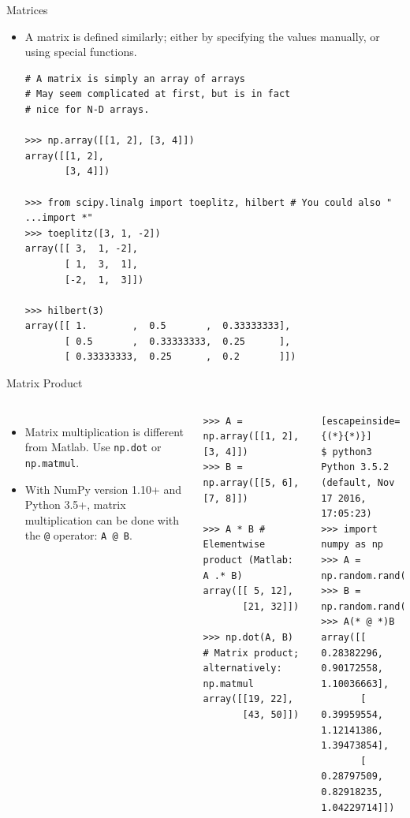 \documentclass[10pt, aspectratio=169]{beamer} %
\begin{document}
\begin{frame}[fragile,allowframebreaks=0.8]
 {Matrices}
\begin{itemize}
\item A matrix is defined similarly; either by specifying the values
manually, or using special functions.
\begin{lstlisting}
# A matrix is simply an array of arrays
# May seem complicated at first, but is in fact
# nice for N-D arrays.

>>> np.array([[1, 2], [3, 4]])
array([[1, 2],
       [3, 4]])

>>> from scipy.linalg import toeplitz, hilbert # You could also " ...import *"
>>> toeplitz([3, 1, -2])
array([[ 3,  1, -2],
       [ 1,  3,  1],
       [-2,  1,  3]])

>>> hilbert(3)
array([[ 1.        ,  0.5       ,  0.33333333],
       [ 0.5       ,  0.33333333,  0.25      ],
       [ 0.33333333,  0.25      ,  0.2       ]])
\end{lstlisting}
\end{itemize}
\end{frame}

\begin{frame}[fragile,allowframebreaks=0.8]
{Matrix Product}
\begin{columns}%
\begin{itemize}
\item Matrix multiplication is different from Matlab.
Use \verb+np.dot+ or \verb+np.matmul+.
\item With NumPy version 1.10+ and Python 3.5+, matrix multiplication can be done
with the \verb+@+ operator: \verb+A @ B+.
\end{itemize}
\begin{lstlisting}
>>> A = np.array([[1, 2], [3, 4]])
>>> B = np.array([[5, 6], [7, 8]])

>>> A * B # Elementwise product (Matlab: A .* B)
array([[ 5, 12],
       [21, 32]])

>>> np.dot(A, B) # Matrix product; alternatively: np.matmul
array([[19, 22],
       [43, 50]])
\end{lstlisting}

\begin{lstlisting}[escapeinside={(*}{*)}]
$ python3
Python 3.5.2 (default, Nov 17 2016, 17:05:23) 
>>> import numpy as np
>>> A = np.random.rand(3,3)
>>> B = np.random.rand(3,3)
>>> A(* @ *)B
array([[ 0.28382296,  0.90172558,  1.10036663],
       [ 0.39959554,  1.12141386,  1.39473854],
       [ 0.28797509,  0.82918235,  1.04229714]])
\end{lstlisting}
\end{columns}
\end{frame}
\end{document}
